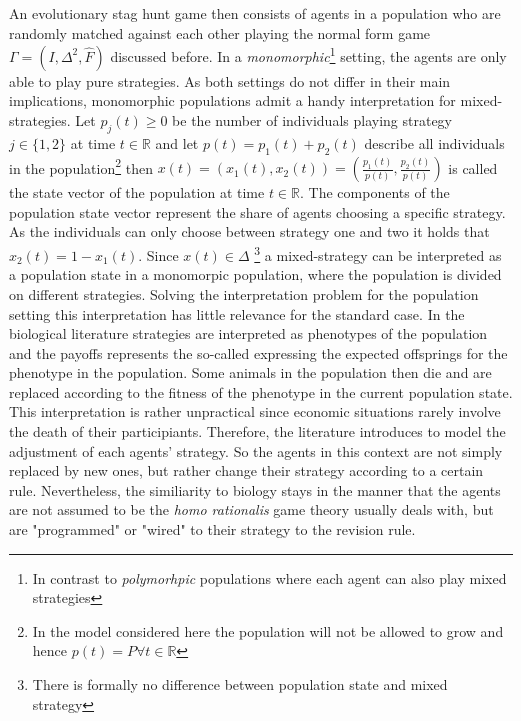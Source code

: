 \documentclass[12pt]{article}
\newcommand{\realnumb}{\mathbb{R}}
\begin{document}
An evolutionary stag hunt game then consists of agents in a population who
are randomly matched against each other playing the normal form game 
$\Gamma = (I,\Delta^2,\hat{F})$ discussed before. In a \textit{monomorphic}\footnote{In 
contrast to \textit{polymorhpic} populations where each agent can also 
play mixed strategies} setting, the agents are only able to play pure 
strategies. As both settings do not differ in their main implications, 
monomorphic populations admit a handy interpretation for mixed-strategies.
Let $p_j(t) \geq 0$ be the number of individuals playing strategy $j \in \{1,2\}$
at time $t \in \realnumb$ and let $p(t) = p_1(t) + p_2(t)$ describe all individuals 
in the population\footnote{In the model considered here the population will 
not be allowed to grow and hence $p(t) = P \forall t \in \realnumb$}
then $x(t) = \left(x_1(t),x_2(t)\right)=\left(\frac{p_1(t)}{p(t)},\frac{p_2(t)}{p(t)}\right)$ is called the state vector of the population at
time $t \in \realnumb$. The components of the population state vector represent
the share of agents choosing a specific strategy. 
As the individuals can only choose between strategy one and two it holds that 
$x_2(t) = 1-x_1(t)$. Since $x(t) \in \Delta$ \footnote{There is formally no
difference between population state and mixed strategy} a mixed-strategy can 
be interpreted as a population state in a monomorpic population, where the 
population is divided on different strategies. Solving the interpretation
problem for the population setting this interpretation has little relevance
for the standard case. 
In the biological literature\cite{maynard} strategies are interpreted as
phenotypes of the population and the payoffs represents the so-called 
 expressing the expected offsprings for the phenotype
in the population. Some animals in the population then die and are replaced
according to the fitness of the phenotype in the current population
state. 
This interpretation is rather unpractical since economic situations rarely
involve the death of their participiants. Therefore, the literature introduces
 to model the adjustment of each agents' strategy.
So the agents in this context are not simply replaced by new ones, but rather
change their strategy according to a certain rule. Nevertheless, the
similiarity to biology stays in the manner that the agents are not
assumed to be the \textit{homo rationalis} game theory usually deals with, but
are "programmed" or "wired" \cite{gintis} to their strategy to the revision rule.
\end{document}
